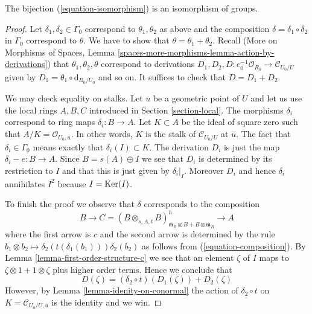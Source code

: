 \begin{lemma}
\label{lemma-composition-is-addition}
The bijection (\ref{equation-isomorphism}) is an isomorphism
of groups.
\end{lemma}

\begin{proof}
Let $\delta_1, \delta_2 \in \Gamma_0$ correspond to $\theta_1, \theta_2$
as above and the composition $\delta = \delta_1 \circ \delta_2$
in $\Gamma_0$ correspond to $\theta$. We have to show that
$\theta = \theta_1 + \theta_2$. Recall
(More on Morphisms of Spaces, Lemma
\ref{spaces-more-morphisms-lemma-action-by-derivations})
that $\theta_1, \theta_2, \theta$ correspond to derivations
$D_1, D_2, D : e_0^{-1}\mathcal{O}_{R_0} \to \mathcal{C}_{U_0/U}$
given by $D_1 = \theta_1 \circ \text{d}_{R_0/U_0}$ and so on.
It suffices to check that $D = D_1 + D_2$.

\medskip\noindent
We may check equality on stalks.
Let $\overline{u}$ be a geometric point of $U$ and let us use the local
rings $A, B, C$ introduced in Section \ref{section-local}.
The morphisms $\delta_i$ correspond to ring
maps $\delta_i : B \to A$. Let $K \subset A$ be the ideal of
square zero such that $A/K = \mathcal{O}_{U_0, \overline{u}}$.
In other words, $K$ is the stalk of $\mathcal{C}_{U_0/U}$ at $\overline{u}$.
The fact that $\delta_i \in \Gamma_0$
means exactly that $\delta_i(I) \subset K$.
The derivation $D_i$ is just the map $\delta_i - e : B \to A$.
Since $B = s(A) \oplus I$ we see that $D_i$ is determined by
its restriction to $I$ and that this is just given by
$\delta_i|_I$. Moreover $D_i$ and hence $\delta_i$ annihilates $I^2$
because $I = \mathop{\mathrm{Ker}}(I)$.

\medskip\noindent
To finish the proof we observe that $\delta$ corresponds to the
composition
$$
B \to C =
(B \otimes_{s, A, t} B)^h_{\mathfrak m_B \otimes B + B \otimes \mathfrak m_B}
\to A
$$
where the first arrow is $c$ and the second arrow is determined
by the rule
$b_1 \otimes b_2 \mapsto \delta_2(t(\delta_1(b_1))) \delta_2(b_2)$
as follows from (\ref{equation-composition}).
By Lemma \ref{lemma-first-order-structure-c}
we see that an element $\zeta$ of $I$ maps to
$\zeta \otimes 1 + 1 \otimes \zeta$ plus higher order terms.
Hence we conclude that
$$
D(\zeta) = (\delta_2 \circ t)\left(D_1(\zeta)\right) + D_2(\zeta)
$$
However, by Lemma \ref{lemma-idenity-on-conormal}
the action of $\delta_2 \circ t$ on
$K = \mathcal{C}_{U_0/U, \overline{u}}$ is the identity and
we win.
\end{proof}






